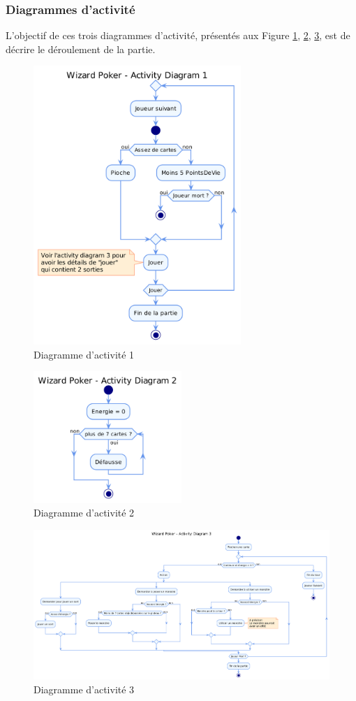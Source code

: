 \documentclass[11pt,a4paper]{article}
\begin{document}
\subsubsection{Diagrammes d'activité}
L'objectif de ces trois diagrammes d'activité, présentés aux Figure \ref{fig:act1}, \ref{fig:act2}, \ref{fig:act3}, est de décrire le déroulement de la partie.
\begin{figure}[ht]
  \centering
  \includegraphics[width=0.7\textwidth]{../uml_files/ActivityDiagram.png}
  \caption{\label{fig:act1} Diagramme d'activité 1}
\end{figure}

\begin{figure}[ht]
  \centering
  \includegraphics[width=0.5\textwidth]{../uml_files/ActivityDiagram2.png}
  \caption{\label{fig:act2} Diagramme d'activité 2}
\end{figure}

\begin{figure}
  \centering
  \includegraphics[width=1\textwidth]{../uml_files/ActivityDiagram3.png}
  \caption{\label{fig:act3} Diagramme d'activité 3}
\end{figure}

\clearpage
\printindex
\end{document}
